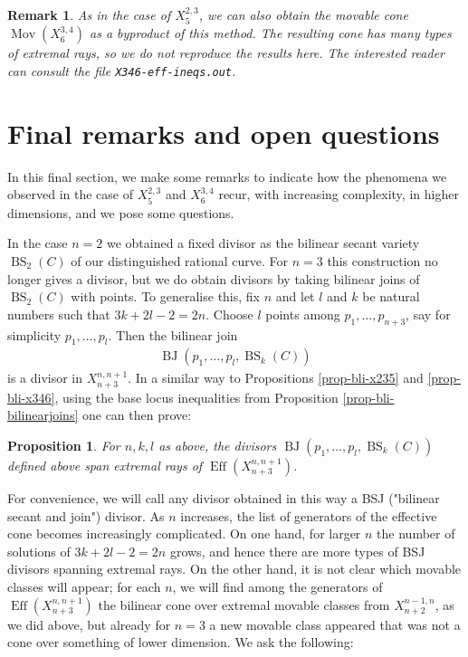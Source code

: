 \documentclass[a4paper,11pt]{article}
\newtheorem{proposition}[theorem]{Proposition}
\newtheorem{remark}[theorem]{Remark}
\newcommand{\Eff}{\operatorname{Eff}}
\newcommand{\Mov}{\operatorname{Mov}}
\newcommand{\BJ}{\operatorname{BJ}}
\newcommand{\BS}{\operatorname{BS}}
\begin{document}
\begin{remark}
As in the case of $X^{2,3}_5$, we can also obtain the movable cone $\Mov(X^{3,4}_6)$ as a byproduct of this method. The resulting cone has many types of extremal rays, so we do not reproduce the results here. The interested reader can consult the file {\tt X346-eff-ineqs.out}.
\end{remark}

\section{Final remarks and open questions}
\label{section-Xn,n,n+3}
In this final section, we make some remarks to indicate how the phenomena we observed in the case of $X^{2,3}_5$ and $X^{3,4}_6$
recur, with increasing complexity, in higher dimensions, and we pose some questions.

In the case $n=2$ we obtained a fixed divisor as the bilinear secant variety $\BS_2(C)$ of our distinguished rational curve. For $n=3$ this construction no longer gives a divisor, but we do obtain divisors by taking bilinear joins of $\BS_2(C)$ with points. To generalise this, fix $n$ and let $l$ and $k$ be natural numbers such that $3k+2l-2=2n$. Choose $l$ points among $p_1,\ldots,p_{n+3}$, say for simplicity $p_1,\ldots,p_l$. Then the bilinear join
\begin{align*}
    \BJ(p_1,\ldots,p_l,\BS_k(C))
\end{align*}
is a divisor in $X^{n,n+1}_{n+3}$. In a similar way to Propositions \ref{prop-bli-x235} and \ref{prop-bli-x346}, using the base locus inequalities from Proposition \ref{prop-bli-bilinearjoins} one can then prove:
\begin{proposition}
For $n,k,l$ as above, the divisors $\BJ(p_1,\ldots,p_l,\BS_k(C))$ defined above span extremal rays of $\Eff(X^{n,n+1}_{n+3})$.
\end{proposition}
For convenience, we will call any divisor obtained in this way a BSJ ("bilinear secant and join") divisor. As $n$ increases, the list of generators of the effective cone becomes increasingly complicated. On one hand, for larger $n$ the number of solutions of $3k+2l-2=2n$ grows, and hence there are more types of BSJ divisors spanning extremal rays. On the other hand, it is not clear which movable classes will appear; for each $n$, we will find among the generators of $\Eff(X^{n,n+1}_{n+3})$ the bilinear cone over extremal movable classes from $X^{n-1,n}_{n+2}$, as we did above, but already for $n=3$ a new movable class appeared that was not a cone over something of lower dimension. We ask the following:
\end{document}
